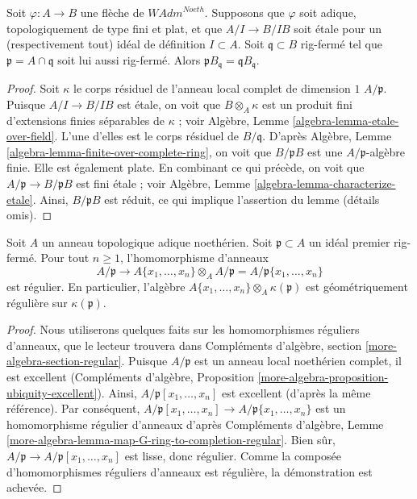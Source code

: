 \begin{lemma}
\label{lemma-rig-closed-point-etale}
Soit $\varphi : A \to B$ une flèche de $\textit{WAdm}^{Noeth}$.
Supposons que $\varphi$ soit adique, topologiquement de type fini et plat,
et que $A/I \to B/IB$ soit étale pour un (respectivement tout)
idéal de définition $I \subset A$. Soit $\mathfrak q \subset B$
rig-fermé tel que $\mathfrak p = A \cap \mathfrak q$
soit lui aussi rig-fermé. Alors
$\mathfrak p B_\mathfrak q = \mathfrak q B_\mathfrak q$.
\end{lemma}

\begin{proof}
Soit $\kappa$ le corps résiduel de l'anneau local complet de dimension $1$
$A/\mathfrak p$. Puisque $A/I \to B/IB$ est étale, on voit que
$B \otimes_A \kappa$ est un produit fini d'extensions finies séparables
de $\kappa$ ; voir
Algèbre, Lemme \ref{algebra-lemma-etale-over-field}.
L'une d'elles est le corps résiduel de $B/\mathfrak q$.
D'après Algèbre, Lemme \ref{algebra-lemma-finite-over-complete-ring}, on voit que
$B/\mathfrak p B$ est une $A/\mathfrak p$-algèbre finie.
Elle est également plate. En combinant ce qui précède,
on voit que $A/\mathfrak p  \to B /\mathfrak p B$
est fini étale ; voir
Algèbre, Lemme \ref{algebra-lemma-characterize-etale}.
Ainsi, $B/\mathfrak p B$ est réduit, ce qui implique l'assertion du
lemme (détails omis).
\end{proof}

\begin{lemma}
\label{lemma-fibre-regular}
Soit $A$ un anneau topologique adique noethérien.
Soit $\mathfrak p \subset A$ un idéal premier rig-fermé.
Pour tout $n \geq 1$, l'homomorphisme d'anneaux
$$
A/\mathfrak p
\longrightarrow
A\{x_1, \ldots, x_n\} \otimes_A A/\mathfrak p =
A/\mathfrak p\{x_1, \ldots, x_n\}
$$
est régulier. En particulier, l'algèbre
$A\{x_1, \ldots, x_n\} \otimes_A \kappa(\mathfrak p)$
est géométriquement régulière sur $\kappa(\mathfrak p)$.
\end{lemma}

\begin{proof}
Nous utiliserons quelques faits sur les homomorphismes réguliers d'anneaux,
que le lecteur trouvera dans Compléments d'algèbre, section \ref{more-algebra-section-regular}.
Puisque $A/\mathfrak p$ est un anneau local noethérien complet, il
est excellent (Compléments d'algèbre, Proposition
\ref{more-algebra-proposition-ubiquity-excellent}).
Ainsi, $A/\mathfrak p[x_1, \ldots, x_n]$ est excellent
(d'après la même référence). Par conséquent,
$A/\mathfrak p[x_1, \ldots, x_n] \to A/\mathfrak p\{x_1, \ldots, x_n\}$
est un homomorphisme régulier d'anneaux d'après
Compléments d'algèbre, Lemme
\ref{more-algebra-lemma-map-G-ring-to-completion-regular}.
Bien sûr, $A/\mathfrak p \to A/\mathfrak p[x_1, \ldots, x_n]$
est lisse, donc régulier. Comme la composée d'homomorphismes réguliers
d'anneaux est régulière, la démonstration est achevée.
\end{proof}








